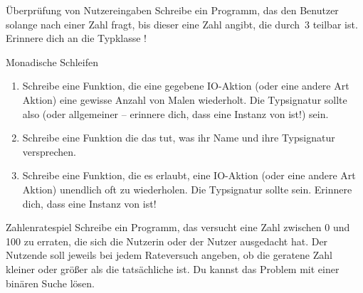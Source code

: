 \documentclass{uebblatt}
\begin{document}
\begin{aufgabe}{Überprüfung von Nutzereingaben}
Schreibe ein Programm, das den Benutzer solange nach einer Zahl fragt, bis dieser eine Zahl angibt, die durch~3 teilbar ist. Erinnere dich an die Typklasse !
\end{aufgabe}

\begin{aufgabe}{Monadische Schleifen}
\begin{enumerate}
\item Schreibe eine Funktion, die eine gegebene IO-Aktion (oder eine andere Art Aktion) eine gewisse Anzahl von Malen wiederholt. Die Typsignatur sollte also  (oder allgemeiner  -- erinnere dich, dass  eine Instanz von  ist!) sein.
\item Schreibe eine Funktion  die das tut, was ihr Name und ihre Typsignatur versprechen.
\item Schreibe eine Funktion, die es erlaubt, eine IO-Aktion (oder eine andere Art Aktion) unendlich oft zu wiederholen. Die Typsignatur sollte  sein. Erinnere dich, dass  eine Instanz von  ist!
\end{enumerate}
\end{aufgabe}

\begin{aufgabe}{Zahlenratespiel}
Schreibe ein Programm, das versucht eine Zahl zwischen 0 und 100 zu erraten, die sich die Nutzerin oder der Nutzer ausgedacht hat. Der Nutzende soll jeweils bei jedem Rateversuch angeben, ob die geratene Zahl kleiner oder größer als die tatsächliche ist. Du kannst das Problem mit einer binären Suche lösen.
\end{aufgabe}
\end{document}

